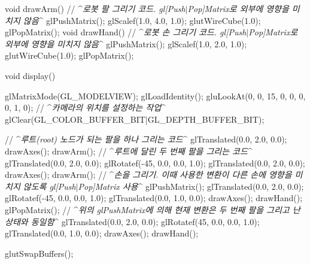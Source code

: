 void drawArm() { // ^{\it 로봇 팔 그리기 코드. gl[Push$|$Pop]Matrix로 외부에 영향을 미치지 않음}^
    glPushMatrix();
    glScalef(1.0, 4.0, 1.0);
    glutWireCube(1.0);
    glPopMatrix();
}
void drawHand() { // ^{\it 로봇 손 그리기 코드. gl[Push$|$Pop]Matrix로 외부에 영향을 미치지 않음}^
    glPushMatrix();
    glScalef(1.0, 2.0, 1.0);
    glutWireCube(1.0);
    glPopMatrix();
}

void display() {
    glMatrixMode(GL_MODELVIEW);
    glLoadIdentity();
    gluLookAt(0, 0, 15, 0, 0, 0, 0, 1, 0);     // ^{\it 카메라의 위치를 설정하는 작업}^
    glClear(GL_COLOR_BUFFER_BIT|GL_DEPTH_BUFFER_BIT);
    
    // ^{\it 루트(root) 노드가 되는 팔을 하나 그리는 코드}^
    glTranslated(0.0, 2.0, 0.0);
    drawAxes();
    drawArm();
    // ^{\it 루트에 달린 두 번째 팔을 그리는 코드}^
    glTranslated(0.0, 2.0, 0.0);
    glRotatef(-45, 0.0, 0.0, 1.0);
    glTranslated(0.0, 2.0, 0.0);
    drawAxes();
    drawArm();
    // ^{\it 손을 그리기. 이때 사용한 변환이 다른 손에 영향을 미치지 않도록 gl[Push$|$Pop]Matrix 사용}^
    glPushMatrix();
    glTranslated(0.0, 2.0, 0.0);
    glRotatef(-45, 0.0, 0.0, 1.0);
    glTranslated(0.0, 1.0, 0.0);
    drawAxes();
    drawHand();
    glPopMatrix();
    // ^{\it 위의 glPushMatrix에 의해 현재 변환은 두 번째 팔을 그리고 난 상태와 동일함}^
    glTranslated(0.0, 2.0, 0.0);
    glRotatef(45, 0.0, 0.0, 1.0);
    glTranslated(0.0, 1.0, 0.0);
    drawAxes();
    drawHand();
    
    glutSwapBuffers();
}